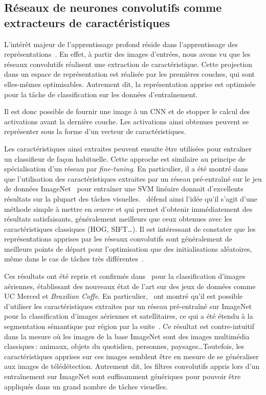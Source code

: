 \subsection{Réseaux de neurones convolutifs comme extracteurs de caractéristiques}

L'intérêt majeur de l'apprentissage profond réside dans l'apprentissage des représentations~\cite{bengio_representation_2013,goodfellow_deep_2016}. En effet, à partir des images d'entrées, nous avons vu que les réseaux convolutifs réalisent une extraction de caractéristique. Cette projection dans un espace de représentation est réalisée par les premières couches, qui sont elles-mêmes optimisables. Autrement dit, la représentation apprise est optimisée pour la tâche de classification sur les données d'entraînement.

Il est donc possible de fournir une image à un \gls{CNN} et de stopper le calcul des activations avant la dernière couche. Les activations ainsi obtenues peuvent se représenter sous la forme d'un vecteur de caractéristiques.

Les caractéristiques ainsi extraites peuvent ensuite être utilisées pour entraîner un classifieur de façon habituelle. Cette approche est similaire au principe de spécialisation d'un réseau par \emph{fine-tuning}. En particulier, il a été montré dans~\cite{razavian_cnn_2014} que l'utilisation des caractéristiques extraites par un réseau pré-entraîné sur le jeu de données ImageNet~\cite{deng_imagenet_2009} pour entraîner une \gls{SVM} linéaire donnait d'excellents résultats sur la plupart des tâches visuelles.~\cite{razavian_cnn_2014} défend ainsi l'idée qu'il s'agit d'une méthode simple à mettre en \oe{}uvre et qui permet d'obtenir immédiatement des résultats satisfaisants, généralement meilleurs que ceux obtenues avec les caractéristiques classiques (\gls{HOG}, \gls{SIFT}\dots). Il est intéressant de constater que les représentations apprises par les réseaux convolutifs sont généralement de meilleurs points de départ pour l'optimisation que des initialisations aléatoires, même dans le cas de tâches très différentes~\cite{yosinski_how_2014}.

Ces résultats ont été repris et confirmés dans~\cite{penatti_deep_2015,marmanis_deep_2016,lagrange_benchmarking_2015} pour la classification d'images aériennes, établissant des nouveaux état de l'art sur des jeux de données comme UC Merced et \emph{Brazilian Coffe}. En particulier,~\cite{marmanis_deep_2016,penatti_deep_2015} ont montré  qu'il est possible d'utiliser les caractéristiques extraites par un réseau pré-entraîné sur ImageNet pour la classification d'images aériennes et satellitaires, ce qui a été étendu à la segmentation sémantique par région par la suite~\cite{lagrange_benchmarking_2015}. Ce résultat est contre-intuitif dans la mesure où les images de la base ImageNet sont des images multimédia classiques\,: animaux, objets du quotidien, personnes, paysages\dots Toutefois, les caractéristiques apprises sur ces images semblent être en mesure de se généraliser aux images de télédétection. Autrement dit, les filtres convolutifs appris lors d'un entraînement sur ImageNet sont suffisamment génériques pour pouvoir être appliqués dans un grand nombre de tâches visuelles.

